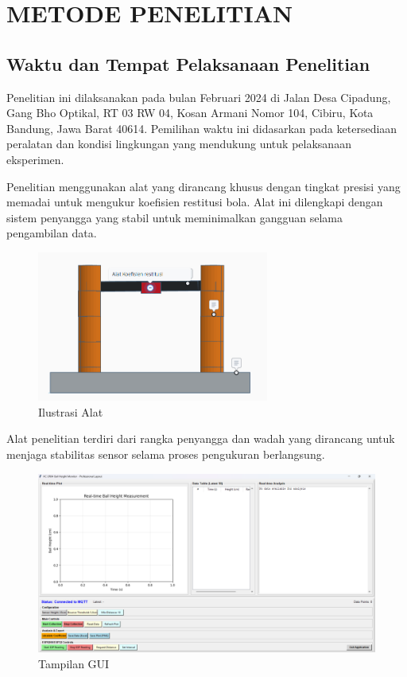 \chapter{METODE PENELITIAN}\label{cha:metode}

\section{Waktu dan Tempat Pelaksanaan Penelitian}
Penelitian ini dilaksanakan pada bulan Februari 2024 di Jalan Desa Cipadung, Gang Bho Optikal, RT 03 RW 04, Kosan Armani Nomor 104, Cibiru, Kota Bandung, Jawa Barat 40614. Pemilihan waktu ini didasarkan pada ketersediaan peralatan dan kondisi lingkungan yang mendukung untuk pelaksanaan eksperimen.

Penelitian menggunakan alat yang dirancang khusus dengan tingkat presisi yang memadai untuk mengukur koefisien restitusi bola. Alat ini dilengkapi dengan sistem penyangga yang stabil untuk meminimalkan gangguan selama pengambilan data.

\begin{figure}
    \centering
    \includegraphics[width = 18pc]{images/Ilustrasi Alat.png}
    \caption{Ilustrasi Alat}
    \label{fig:ilustrasi_alat}
\end{figure}

Alat penelitian terdiri dari rangka penyangga dan wadah yang dirancang untuk menjaga stabilitas sensor selama proses pengukuran berlangsung.

\begin{figure}
    \centering
    \includegraphics[width =\textwidth]{images/Tampilan GUI.png}
    \caption{Tampilan GUI}
    \label{fig:tampilan_gui}
\end{figure}

